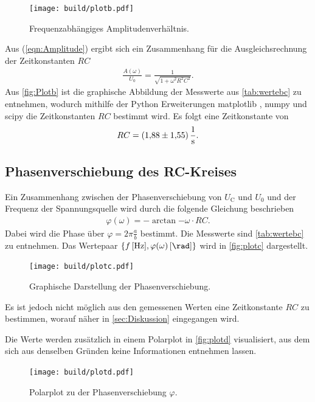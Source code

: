 \begin{figure}[H]
    \centering
    \texttt{[image: build/plotb.pdf]}
    \caption{Frequenzabhängiges Amplitudenverhältnis.}
    \label{fig:Plotb}
\end{figure}
Aus (\ref{eqn:Amplitude}) ergibt sich ein Zusammenhang für die Ausgleichsrechnung der Zeitkonstanten $RC$
\begin{align}
    \frac{A(\omega)}{U_0} = \frac{1}{\sqrt{1+\omega^2R^2C^2}}.
    \label{eqn:ausgl}
\end{align}
Aus \autoref{fig:Plotb} ist die graphische Abbildung der Messwerte aus \autoref{tab:wertebc} zu entnehmen, wodurch mithilfe der Python
Erweiterungen matplotlib \cite{matplotlib}, numpy \cite{numpy} und scipy \cite{scipy} die Zeitkonstanten $RC$ bestimmt wird.
Es folgt eine Zeitkonstante von
\begin{align*}
    RC = \SI{1.88 (1.55)}{\per\second}.
\end{align*}

\subsection{Phasenverschiebung des RC-Kreises}
Ein Zusammenhang zwischen der Phasenverschiebung von $U_{\text{C}}$ und $U_0$ und der Frequenz der Spannungsquelle wird durch
die folgende Gleichung beschrieben
\begin{align}
    \varphi(\omega) = -\arctan{-\omega\cdot RC}.
    \label{eqn:phasev}
\end{align}
Dabei wird die Phase über $\varphi = 2\pi\frac ab$ bestimmt. Die Messwerte sind \autoref{tab:wertebc} zu entnehmen.
Das Wertepaar $\{f\,[\si{\hertz}], \varphi(\omega)\, [\si{\rad}]\}$ wird in \autoref{fig:plotc} dargestellt.
\begin{figure}[H]
    \centering
    \texttt{[image: build/plotc.pdf]}
    \caption{Graphische Darstellung der Phasenverschiebung.}
    \label{fig:plotc}
\end{figure}
Es ist jedoch nicht möglich aus den gemessenen Werten eine Zeitkonstante $RC$ zu bestimmen, worauf näher in \autoref{sec:Diskussion}
eingegangen wird.

Die Werte werden zusätzlich in einem Polarplot in \autoref{fig:plotd} visualisiert, aus dem sich aus denselben Gründen 
keine Informationen entnehmen lassen.
\begin{figure}[H]
    \centering
    \texttt{[image: build/plotd.pdf]}
    \caption{Polarplot zu der Phasenverschiebung $\varphi$.}
    \label{fig:plotd}
\end{figure}

